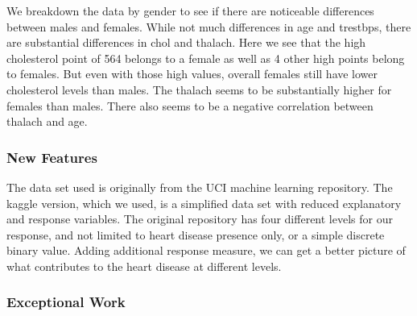 \documentclass[11pt]{article}
\begin{document}
    We breakdown the data by gender to see if there are noticeable
differences between males and females. While not much differences in age
and trestbps, there are substantial differences in chol and thalach.
Here we see that the high cholesterol point of 564 belongs to a female
as well as 4 other high points belong to females. But even with those
high values, overall females still have lower cholesterol levels than
males. The thalach seems to be substantially higher for females than
males. There also seems to be a negative correlation between thalach and
age.

    \subsubsection{New Features}\label{new-features}

    The data set used is originally from the UCI machine learning
repository. The kaggle version, which we used, is a simplified data set
with reduced explanatory and response variables. The original repository
has four different levels for our response, and not limited to heart
disease presence only, or a simple discrete binary value. Adding
additional response measure, we can get a better picture of what
contributes to the heart disease at different levels.

    \subsubsection{Exceptional Work}\label{exceptional-work}
\end{document}
